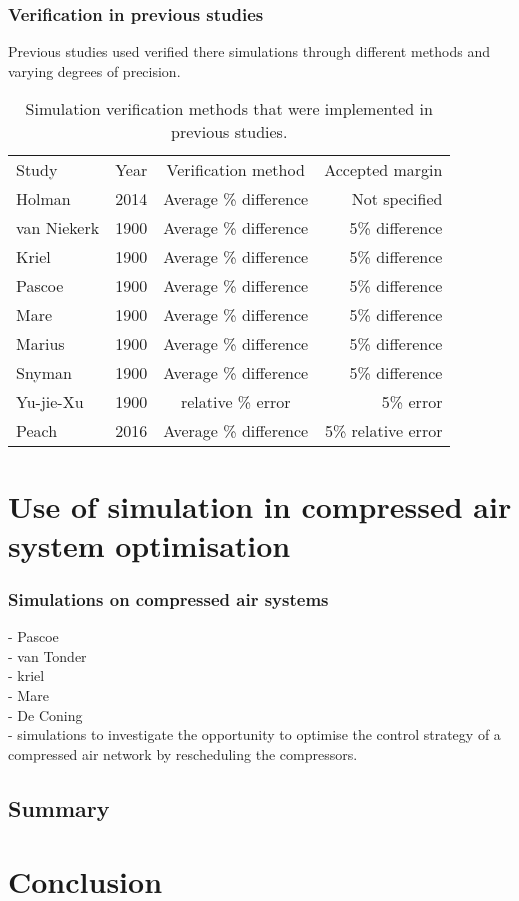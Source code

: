  	\subsubsection{Verification in previous studies}
 	Previous studies used verified there simulations through different methods and varying degrees of precision. \\
 	\begin{table}[h]
 		\centering
 		\begin{tabular}{p{5cm}ccr}
 			\hline
 			Study & Year & Verification method & Accepted margin\\
 			\hhline{====}
 			Holman \cite{Holman2014Masters} & 2014 & Average \% difference & Not specified  \\
 			van Niekerk \cite{vanNiekerk2012Value} & 1900 & Average \% difference & 5\% difference \\
 			Kriel \cite{Marais2012PhD} &  1900 & Average \% difference & 5\% difference \\
 			Pascoe \cite{Pascoe2016Masters} & 1900 & Average \% difference & 5\% difference \\	
 			Mare \cite{Mare2016PhD} & 1900 & Average \% difference & 5\% difference  \\
 			Marius \cite{Marais2012PhD} & 1900 & Average \% difference & 5\% difference\\	
 			Snyman	\cite{Snyman2011Masters} & 1900 & Average \% difference & 5\% difference\\	
 			Yu-jie-Xu \cite{xu2016modeling}& 1900 & relative \% error & 5\%  error\\	
 			Peach \cite{Peach2016Masters}& 2016 & Average \% difference & 5\% relative error\\
 			\hline
 		\end{tabular} 
 		\caption{Simulation verification methods that were implemented in previous studies.}
 		\label{table: Verification studies}
 	\end{table}
\clearpage	
\section{Use of simulation in compressed air system optimisation}
	

	\subsubsection{Simulations on compressed air systems}
	
		- Pascoe \\
		- van Tonder\\
		- kriel\\
		- Mare\\
		- De Coning \\-  simulations to investigate the opportunity to optimise the control strategy of a compressed air network by rescheduling the compressors.\\
	\subsection{Summary}
	\label{Shortcomings of previous work}
		\clearpage	
\section{Conclusion}